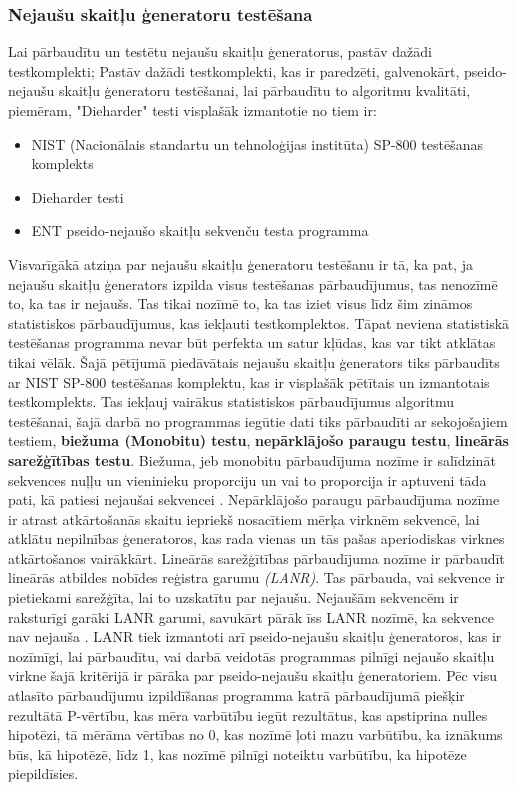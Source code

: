 \documentclass[12pt]{article}
\begin{document}
    \subsubsection{Nejaušu skaitļu ģeneratoru testēšana}
    Lai pārbaudītu un testētu nejaušu skaitļu ģeneratorus, pastāv dažādi testkomplekti;
    Pastāv dažādi testkomplekti, kas ir paredzēti, galvenokārt, pseido-nejaušu skaitļu ģeneratoru testēšanai, lai pārbaudītu to algoritmu kvalitāti, piemēram, "Dieharder" testi \parencite{dieharder}
    visplašāk izmantotie no tiem ir: 
    \begin{itemize}
            \item NIST (Nacionālais standartu un tehnoloģijas institūta) SP-800 testēšanas komplekts \parencite{NIST_orig} 
            \item Dieharder testi \parencite{dieharder}
            \item ENT pseido-nejaušo skaitļu sekvenču testa programma \parencite{ent_orig}
       \end{itemize} 
    Visvarīgākā atziņa par nejaušu skaitļu ģeneratoru testēšanu ir tā, ka pat, ja nejaušu skaitļu ģenerators izpilda visus testēšanas pārbaudījumus, tas nenozīmē to, ka tas ir nejaušs. \parencite{patiesinejausie} Tas tikai nozīmē to, ka tas iziet visus līdz šim zināmos statistiskos pārbaudījumus, kas iekļauti testkomplektos. Tāpat neviena statistiskā testēšanas programma nevar būt perfekta un satur kļūdas, kas var tikt atklātas tikai vēlāk. \parencite{NIST_korekcijas} Šajā pētījumā piedāvātais nejaušu skaitļu ģenerators tiks pārbaudīts ar NIST SP-800 testēšanas komplektu, kas ir visplašāk pētītais un izmantotais testkomplekts.
    Tas iekļauj vairākus statistiskos pārbaudījumus algoritmu testēšanai, šajā darbā no programmas iegūtie dati tiks pārbaudīti ar sekojošajiem testiem, \textbf{biežuma (Monobitu) testu}, \textbf{nepārklājošo paraugu testu}, \textbf{lineārās sarežģītības testu}. Biežuma, jeb monobitu pārbaudījuma nozīme ir salīdzināt sekvences nuļļu un vieninieku proporciju un vai to proporcija ir aptuveni tāda pati, kā patiesi nejaušai sekvencei \parencite{NIST_orig}. Nepārklājošo paraugu pārbaudījuma nozīme ir atrast atkārtošanās skaitu iepriekš nosacītiem mērķa virknēm sekvencē, lai atklātu nepilnības ģeneratoros, kas rada vienas un tās pašas aperiodiskas virknes atkārtošanos vairākkārt. Lineārās sarežģītības pārbaudījuma nozīme ir pārbaudīt lineārās atbildes nobīdes reģistra garumu \emph{(LANR)}. Tas pārbauda, vai sekvence ir pietiekami sarežģīta, lai to uzskatītu par nejaušu. Nejaušām sekvencēm ir raksturīgi garāki LANR garumi, savukārt pārāk īss LANR nozīmē, ka sekvence nav nejauša \parencite{NIST_orig}. LANR tiek izmantoti arī pseido-nejaušu skaitļu ģeneratoros, kas ir nozīmīgi, lai pārbaudītu, vai darbā veidotās programmas pilnīgi nejaušo skaitļu virkne šajā kritērijā ir pārāka par pseido-nejaušu skaitļu ģeneratoriem. Pēc visu atlasīto pārbaudījumu izpildīšanas programma katrā pārbaudījumā piešķir rezultātā P-vērtību, kas mēra varbūtību iegūt rezultātus, kas apstiprina nulles hipotēzi, tā mērāma vērtības no 0, kas nozīmē ļoti mazu varbūtību, ka iznākums būs, kā hipotēzē, līdz 1, kas nozīmē pilnīgi noteiktu varbūtību, ka hipotēze piepildīsies.
\end{document}
